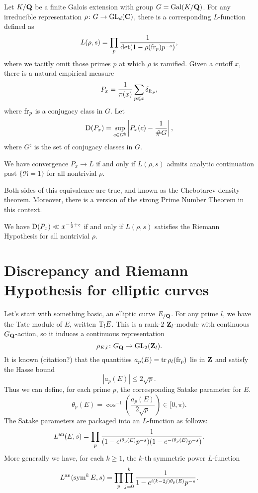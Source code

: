 Let $K/\mathbf{Q}$ be a finite Galois extension with group $G=\operatorname{Gal}(K/\mathbf{Q})$. For any 
irreducible representation $\rho\colon G\to \operatorname{GL}_d(\mathbf{C})$, there is a 
corresponding $L$-function defined as 
\[
	L(\rho,s) = \prod_p \frac{1}{\det(1-\rho(\mathrm{fr}_p) p^{-s})} ,
\]
where we tacitly omit those primes $p$ at which $\rho$ is ramified. Given a 
cutoff $x$, there is a natural empirical measure 
\[
	P_x = \frac{1}{\pi(x)} \sum_{p\leqslant x} \delta_{\mathrm{fr}_p} ,
\]
where $\mathrm{fr}_p$ is a conjugacy class in $G$. Let 
\[
	\operatorname{D}(P_x) = \sup_{c\in G^\natural} \left| P_x(c) - \frac{1}{\# G}\right|,
\]
where $G^\natural$ is the set of conjugacy classes in $G$. 

\begin{theorem}
We have convergence $P_x \to L$ if and only if $L(\rho,s)$ admits analytic 
continuation past $\{\Re =1\}$ for all nontrivial $\rho$. 
\end{theorem}

Both sides of this equivalence are true, and known as the Chebotarev density 
theorem. Moreover, there is a version of the strong Prime Number Theorem in 
this context. 

\begin{theorem}
We have $\operatorname{D}(P_x) \ll x^{-\frac 1 2+\epsilon}$ if and only if $L(\rho,s)$ 
satisfies the Riemann Hypothesis for all nontrivial $\rho$. 
\end{theorem}





\section{Discrepancy and Riemann Hypothesis for elliptic curves}

Let's start with something basic, an elliptic curve $E_{/\mathbf{Q}}$. For any 
prime $l$, we have the Tate module of $E$, written $\mathrm{T}_l E$. This is a 
rank-$2$ $\mathbf{Z}_l$-module with continuous $G_{\mathbf{Q}}$-action, so it induces a 
continuous representation 
\[
	\rho_{E,l} \colon G_{\mathbf{Q}} \to \operatorname{GL}_2(\mathbf{Z}_l) .
\]
It is known (citation?) that the quantities $a_p(E) = \operatorname{tr} \rho_l(\mathrm{fr}_p)$ lie 
in $\mathbf{Z}$ and satisfy the Hasse bound 
\[
	|a_p(E)| \leqslant 2\sqrt p .
\]
Thus we can define, for each prime $p$, the corresponding Satake parameter for 
$E$. 
\[
	\theta_p(E) = \cos^{-1}\left(\frac{a_p(E)}{2\sqrt p}\right) \in [0,\pi) .
\]
The Satake parameters are packaged into an $L$-function as follows:
\[
	L^{\mathrm{an}}(E,s) = \prod_p \frac{1}{(1 - e^{i \theta_p(E)} p^{-s})(1- e^{-i \theta_p(E)} p^{-s})} .
\]
More generally we have, for each $k\geqslant 1$, the $k$-th symmetric power 
$L$-function 
\[
	L^{\mathrm{an}}(\operatorname{sym}^k E, s) = \prod_p \prod_{j=0}^k \frac{1}{1 - e^{i (k - 2j) \theta_p(E)} p^{-s}} .
\]

